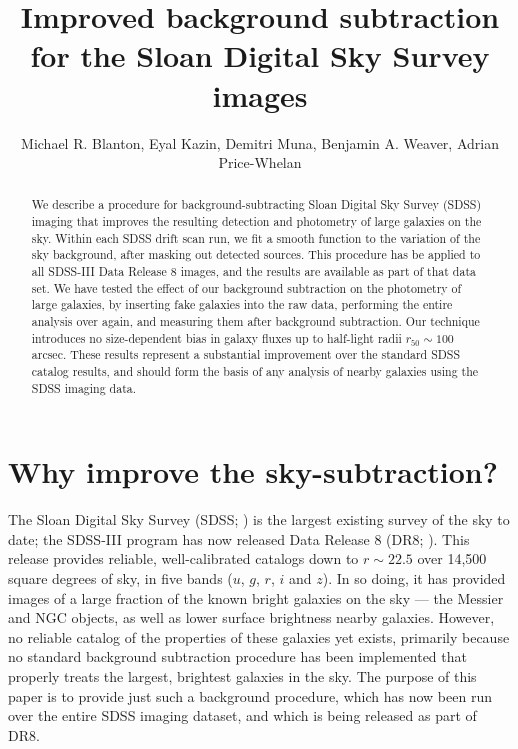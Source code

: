 \documentclass[10pt,preprint]{aastex}
\newcounter{address}
\begin{document}
\title{Improved background subtraction for the Sloan Digital Sky
  Survey images}


\author{
Michael R. Blanton\altaffilmark{\ref{NYU}},
Eyal Kazin\altaffilmark{\ref{NYU}},
Demitri Muna\altaffilmark{\ref{NYU}},
Benjamin A. Weaver\altaffilmark{\ref{NYU}},
Adrian Price-Whelan\altaffilmark{\ref{NYU}} 
}

\setcounter{address}{1}

\begin{abstract}
We describe a procedure for background-subtracting Sloan Digital Sky
Survey (SDSS) imaging that improves the resulting detection and
photometry of large galaxies on the sky.  Within each SDSS drift scan
run, we fit a smooth function to the variation of the sky background,
after masking out detected sources.  This procedure has be applied to
all SDSS-III Data Release 8 images, and the results are available as
part of that data set.  We have tested the effect of our background
subtraction on the photometry of large galaxies, by inserting fake
galaxies into the raw data, performing the entire analysis over again,
and measuring them after background subtraction.  Our technique
introduces no size-dependent bias in galaxy fluxes up to half-light
radii $r_{50} \sim 100$ arcsec. These results represent a substantial
improvement over the standard SDSS catalog results, and should form
the basis of any analysis of nearby galaxies using the SDSS imaging
data.
\end{abstract}

\section{Why improve the sky-subtraction?}
\label{sec:intro}

The Sloan Digital Sky Survey (SDSS; \citealt{york00a}) is the largest
existing survey of the sky to date; the SDSS-III program has now
released Data Release 8 (DR8; \citealt{eisenstein11a, aihara11a}).
This release provides reliable, well-calibrated catalogs down to
$r\sim 22.5$ over 14,500 square degrees of sky, in five bands ($u$,
$g$, $r$, $i$ and $z$).  In so doing, it has provided images of a
large fraction of the known bright galaxies on the sky --- the Messier
and NGC objects, as well as lower surface brightness nearby
galaxies. However, no reliable catalog of the properties of these
galaxies yet exists, primarily because no standard background
subtraction procedure has been implemented that properly treats the
largest, brightest galaxies in the sky. The purpose of this paper is
to provide just such a background procedure, which has now been run
over the entire SDSS imaging dataset, and which is being released as
part of DR8.
\end{document}

